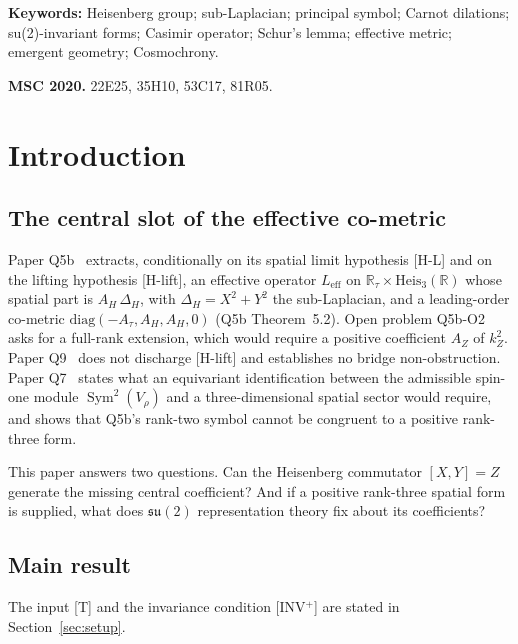 \documentclass[11pt,a4paper]{article}
\theoremstyle{definition}
\theoremstyle{remark}
\DeclareMathOperator{\Sym}{Sym}
\newcommand{\Leff}{L_{\mathrm{eff}}}
\newcommand{\Vr}{V_{\rho}}
\newcommand{\suTwo}{\mathfrak{su}(2)}
\newcommand{\heisR}{\mathrm{Heis}_{3}(\mathbb{R})}
\newcommand{\Az}{A_{Z}}
\newcommand{\AH}{A_{H}}
\begin{document}
  \textbf{Keywords:} Heisenberg group; sub-Laplacian; principal symbol; Carnot dilations; su(2)-invariant forms;
  Casimir operator; Schur's lemma; effective metric; emergent geometry; Cosmochrony.

  \medskip
  \noindent\textbf{MSC 2020.} 22E25, 35H10, 53C17, 81R05.

  \clearpage
  \tableofcontents
  \clearpage

  \section{Introduction}

    \subsection{The central slot of the effective co-metric}

      Paper Q5b~\cite{Beau2026q5b} extracts, conditionally on its spatial limit hypothesis [H-L] and on the lifting
      hypothesis [H-lift], an effective operator $\Leff$ on $\mathbb{R}_{\tau} \times \heisR$ whose spatial part is
      $\AH\,\Delta_H$, with $\Delta_H = X^2 + Y^2$ the sub-Laplacian, and a leading-order co-metric
      $\mathrm{diag}(-A_\tau, \AH, \AH, 0)$ (Q5b Theorem~5.2).
      Open problem Q5b-O2 asks for a full-rank extension, which would require a positive coefficient $\Az$ of $k_Z^2$.
      Paper Q9~\cite{Beau2026q9} does not discharge [H-lift] and establishes no bridge non-obstruction.
      Paper Q7~\cite{Beau2026q7} states what an equivariant identification between the admissible spin-one module
      $\Sym^2(\Vr)$ and a three-dimensional spatial sector would require, and shows that Q5b's rank-two symbol cannot
      be congruent to a positive rank-three form.

      This paper answers two questions.
      Can the Heisenberg commutator $[X, Y] = Z$ generate the missing central coefficient?
      And if a positive rank-three spatial form is supplied, what does $\suTwo$ representation theory fix about its
      coefficients?

    \subsection{Main result}

      The input [T] and the invariance condition [INV$^+$] are stated in Section~\ref{sec:setup}.
\end{document}
